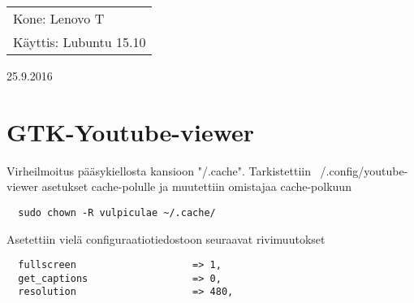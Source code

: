 \documentclass[main.tex]{subfiles}
\begin{document}
\thispagestyle{empty}
\begin{tabular}[t]{l}
Kone: Lenovo T\\
Käyttis: Lubuntu 15.10
\end{tabular}
\hfill 25.9.2016

\section{GTK-Youtube-viewer}

Virheilmoitus pääsykiellosta kansioon "/.cache". Tarkistettiin ~/.config/youtube-viewer asetukset cache-polulle ja muutettiin omistajaa cache-polkuun

\begin{lstlisting}
  sudo chown -R vulpiculae ~/.cache/
\end{lstlisting}

Asetettiin vielä configuraatiotiedostoon seuraavat rivimuutokset

\begin{lstlisting}
  fullscreen                    => 1,
  get_captions                  => 0,
  resolution                    => 480,
\end{lstlisting}
\end{document}
